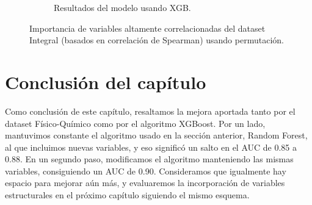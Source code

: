 \begin{figure}[H]
\begin{subfigure}[c]{0.45\linewidth}
\caption{Resultados del modelo usando XGB.}
\label{fig:importance_cluster_integral_xgb}
\end{subfigure}%
\caption{Importancia de variables altamente correlacionadas del dataset Integral (basados en correlación de Spearman) usando permutación.}
\end{figure}

\section{Conclusión del capítulo}

Como conclusión de este capítulo, resaltamos la mejora aportada tanto por el dataset Físico-Químico como por el algoritmo XGBoost. Por un lado, mantuvimos constante el algoritmo usado en la sección anterior, Random Forest, al que incluimos nuevas variables, y eso significó un salto en el AUC de 0.85 a 0.88. En un segundo paso, modificamos el algoritmo manteniendo las mismas variables, consiguiendo un AUC de 0.90. Consideramos que igualmente hay espacio para mejorar aún más, y evaluaremos la incorporación de variables estructurales en el próximo capítulo siguiendo el mismo esquema. 








\newpage

